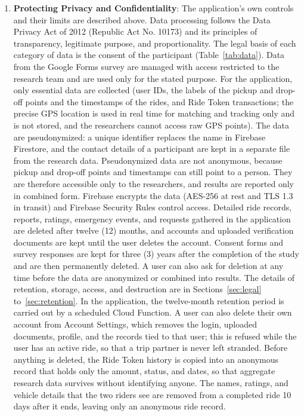 \begin{enumerate}
    \item \textbf{Protecting Privacy and Confidentiality}: The application's own controls and their limits are described above. Data processing follows the Data Privacy Act of 2012 (Republic Act No. 10173) and its principles of transparency, legitimate purpose, and proportionality. The legal basis of each category of data is the consent of the participant (Table~\ref{tab:data}). Data from the Google Forms survey are managed with access restricted to the research team and are used only for the stated purpose. For the application, only essential data are collected (user IDs, the labels of the pickup and drop-off points and the timestamps of the rides, and Ride Token transactions; the precise GPS location is used in real time for matching and tracking only and is not stored, and the researchers cannot access raw GPS points). The data are pseudonymized: a unique identifier replaces the name in Firebase Firestore, and the contact details of a participant are kept in a separate file from the research data. Pseudonymized data are not anonymous, because pickup and drop-off points and timestamps can still point to a person. They are therefore accessible only to the researchers, and results are reported only in combined form. Firebase encrypts the data (AES-256 at rest and TLS 1.3 in transit) and Firebase Security Rules control access. Detailed ride records, reports, ratings, emergency events, and requests gathered in the application are deleted after twelve (12) months, and accounts and uploaded verification documents are kept until the user deletes the account. Consent forms and survey responses are kept for three (3) years after the completion of the study and are then permanently deleted. A user can also ask for deletion at any time before the data are anonymized or combined into results. The details of retention, storage, access, and destruction are in Sections~\ref{sec:legal} to~\ref{sec:retention}. In the application, the twelve-month retention period is carried out by a scheduled Cloud Function. A user can also delete their own account from Account Settings, which removes the login, uploaded documents, profile, and the records tied to that user; this is refused while the user has an active ride, so that a trip partner is never left stranded. Before anything is deleted, the Ride Token history is copied into an anonymous record that holds only the amount, status, and dates, so that aggregate research data survives without identifying anyone. The names, ratings, and vehicle details that the two riders see are removed from a completed ride 10 days after it ends, leaving only an anonymous ride record.

\end{enumerate}

